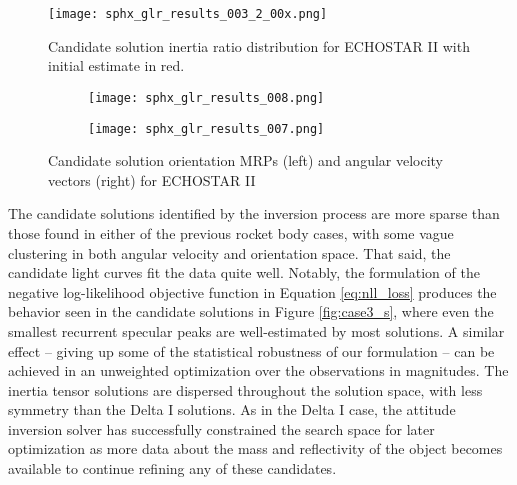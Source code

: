 \documentclass[a4paper,twocolumn]{spaceDebrisC} %
\newcommand{\figmed}[0]{0.4\textwidth}
\newcommand{\figsmall}[0]{0.3\textwidth}
\begin{document}
\begin{figure}[H]
  \centering
  \texttt{[image: sphx\_glr\_results\_003\_2\_00x.png]}
  \caption{Candidate solution inertia ratio distribution for ECHOSTAR II with initial estimate in red.}
  \label{fig:case3_i}
\end{figure}

\begin{figure}[H]
  \centering
  \begin{subfigure}[t]{0.23\textwidth}
    \centering
    \texttt{[image: sphx\_glr\_results\_008.png]}
    \caption{}
    \label{fig:case3_pwa}
  \end{subfigure}
  \hfill
  \begin{subfigure}[t]{0.23\textwidth}
    \centering
    \texttt{[image: sphx\_glr\_results\_007.png]}
    \caption{}
    \label{fig:case3_pwb}
  \end{subfigure}

  \caption{Candidate solution orientation MRPs (left) and angular velocity vectors (right) for ECHOSTAR II}
  \label{fig:case3_pw}
\end{figure}




The candidate solutions identified by the inversion process are more sparse than those found in either of the previous rocket body cases, with some vague clustering in both angular velocity and orientation space. That said, the candidate light curves fit the data quite well. Notably, the formulation of the negative log-likelihood objective function in Equation \ref{eq:nll_loss} produces the behavior seen in the candidate solutions in Figure \ref{fig:case3_s}, where even the smallest recurrent specular peaks are well-estimated by most solutions. A similar effect -- giving up some of the statistical robustness of our formulation -- can be achieved in an unweighted optimization over the observations in magnitudes. The inertia tensor solutions are dispersed throughout the solution space, with less symmetry than the Delta I solutions. As in the Delta I case, the attitude inversion solver has successfully constrained the search space for later optimization as more data about the mass and reflectivity of the object becomes available to continue refining any of these candidates.
\end{document}
